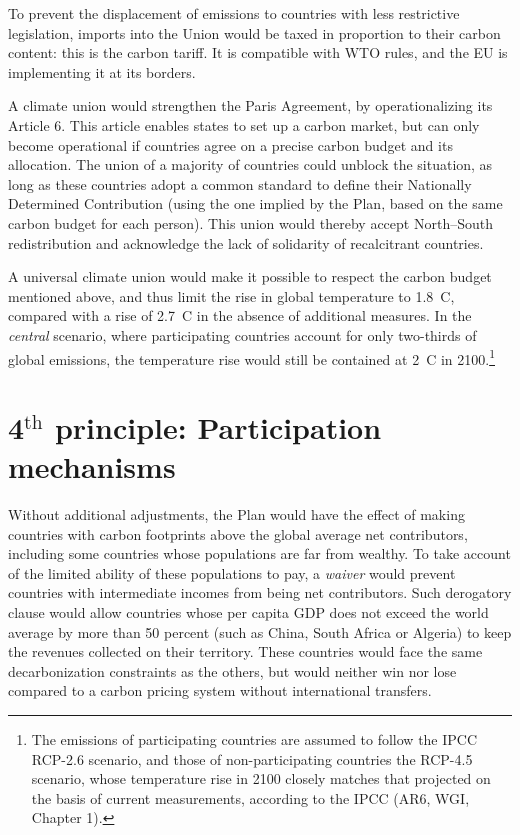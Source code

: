 \documentclass[a5paper,english,openany]{memoir}
\begin{document}
 

To prevent the displacement of emissions to countries with less restrictive legislation, imports into the Union would be taxed in proportion to their carbon content: this is the carbon tariff. It is compatible with WTO rules, and the EU is implementing it at its borders.

A climate union would strengthen the Paris Agreement, by operationalizing its Article 6. This article enables states to set up a carbon market, but can only become operational if countries agree on a precise carbon budget and its allocation. The union of a majority of countries could unblock the situation, as long as these countries adopt a common standard to define their Nationally Determined Contribution (using the one implied by the Plan, based on the same carbon budget for each person). This union would thereby accept North--South redistribution and acknowledge the lack of solidarity of recalcitrant countries. 

A universal climate union would make it possible to respect the carbon budget mentioned above, and thus limit the rise in global temperature to 1.8~\textdegree{}C, compared with a rise of 2.7~\textdegree{}C in the absence of additional measures. In the \textit{central} scenario, where participating countries account for only two-thirds of global emissions, the temperature rise would still be contained at 2~\textdegree{}C in 2100.\footnote{The emissions of participating countries are assumed to follow the IPCC RCP-2.6 scenario, and those of non-participating countries the RCP-4.5 scenario, whose temperature rise in 2100 closely matches that projected on the basis of current measurements, according to the IPCC (AR6, WGI, Chapter 1).}

\section*{4$^\text{th}$ principle: Participation mechanisms}

Without additional adjustments, the Plan would have the effect of making countries with carbon footprints above the global average net contributors, including some countries whose populations are far from wealthy. To take account of the limited ability of these populations to pay, a \textit{waiver} would prevent countries with intermediate incomes from being net contributors. Such derogatory clause would allow countries whose per capita GDP does not exceed the world average by more than 50 percent (such as China, South Africa or Algeria) to keep the revenues collected on their territory. These countries would face the same decarbonization constraints as the others, but would neither win nor lose compared to a carbon pricing system without international transfers. 
\end{document}
